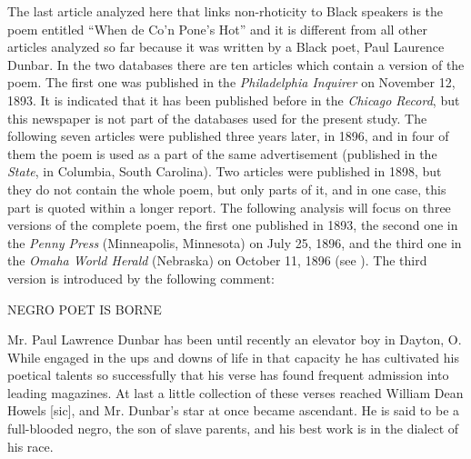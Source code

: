 The last article analyzed here that links non-rhoticity to Black speakers is the poem entitled “When de Co’n Pone’s Hot” and it is different from all other articles analyzed so far because it was written by a Black poet, Paul Laurence Dunbar. In the two databases there are ten articles which contain a version of the poem. The first one was published in the \emph{Philadelphia Inquirer} on November 12, 1893. It is indicated that it has been published before in the \emph{Chicago Record}, but this newspaper is not part of the databases used for the present study. The following seven articles were published three years later, in 1896, and in four of them the poem is used as a part of the same advertisement (published in the \emph{State}, in Columbia, South Carolina). Two articles were published in 1898, but they do not contain the whole poem, but only parts of it, and in one case, this part is quoted within a longer report. The following analysis will focus on three versions of the complete poem, the first one published in 1893, the second one in the \emph{Penny Press} (Minneapolis, Minnesota) on July 25, 1896, and the third one in the \emph{Omaha World Herald} (Nebraska) on October 11, 1896 (see ). The third version is introduced by the following comment:

\begin{ipquote}
\begin{center}
NEGRO PO{\kern0pt}ET IS BORNE\\
\end{center}
Mr. Paul Lawrence Dunbar has been until recently an elevator boy in Dayton, O. While engaged in the ups and downs of life in that capacity he has cultivated his poetical talents so successfully that his verse has found frequent admission into leading magazines. At last a little collection of these verses reached William Dean Howels [sic], and Mr. Dunbar’s star at once became ascendant. He is said to be a full-blooded negro, the son of slave parents, and his best work is in the dialect of his race.
\end{ipquote}


